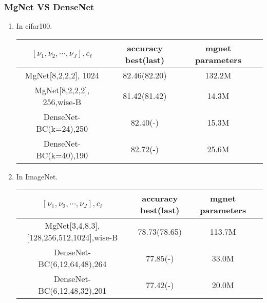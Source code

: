 \subsubsection{MgNet VS DenseNet}
\begin{enumerate}
\item In cifar100.
\begin{table}[!htbp]
	\begin{center}
			\begin{tabular}{|c|c|c|c|}
                \hline
				$[\nu_1,\nu_2,\cdots,\nu_J], c_\ell$   &  accuracy best(last)  & mgnet parameters \tabularnewline
				\hline
				MgNet[8,2,2,2], 1024                   &  82.46(82.20)         &     132.2M       \tabularnewline
				\hline		
				MgNet[8,2,2,2], 256,wise-B             &  81.42(81.42)         &     14.3M        \tabularnewline
				\hline
                DenseNet-BC(k=24),250                  &  82.40(-)             &     15.3M        \tabularnewline
				\hline
                DenseNet-BC(k=40),190                  &  82.72(-)             &     25.6M        \tabularnewline
				\hline
			\end{tabular}
	\end{center}
\end{table}

\item In ImageNet.
\begin{table}[!htbp]
	\begin{center}
			\begin{tabular}{|c|c|c|c|}
                \hline
				$[\nu_1,\nu_2,\cdots,\nu_J], c_\ell$   &  accuracy best(last)  & mgnet parameters \tabularnewline
				\hline		
				MgNet[3,4,8,3],[128,256,512,1024],wise-B &  78.73(78.65)       &     113.7M       \tabularnewline
				\hline
                DenseNet-BC(6,12,64,48),264            &  77.85(-)             &     33.0M        \tabularnewline
				\hline
                DenseNet-BC(6,12,48,32),201            &  77.42(-)             &     20.0M        \tabularnewline
				\hline
			\end{tabular}
	\end{center}
\end{table}
\end{enumerate}

\newpage
